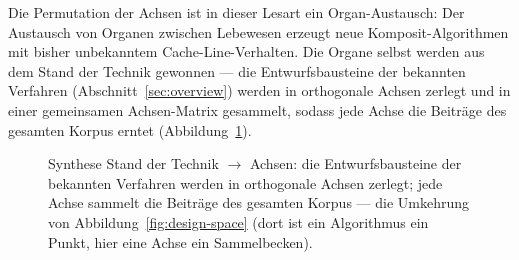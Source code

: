 \begin{nurlang}
Die Permutation der Achsen ist in dieser Lesart ein Organ-Austausch: Der Austausch von Organen zwischen
Lebewesen erzeugt neue Komposit-Algorithmen mit bisher unbekanntem Cache-Line-Verhalten. Die Organe selbst
werden aus dem Stand der Technik gewonnen --- die Entwurfsbausteine der bekannten Verfahren
(Abschnitt~\ref{sec:overview}) werden in orthogonale Achsen zerlegt und in einer gemeinsamen
Achsen-Matrix gesammelt, sodass jede Achse die Beiträge des gesamten Korpus erntet
(Abbildung~\ref{fig:synth}).
\begin{figure}[htbp]\centering
{}
\caption{Synthese Stand der Technik $\to$ Achsen: die Entwurfsbausteine der bekannten Verfahren werden in orthogonale Achsen zerlegt; jede Achse sammelt die Beiträge des gesamten Korpus --- die Umkehrung von Abbildung~\ref{fig:design-space} (dort ist ein Algorithmus ein Punkt, hier eine Achse ein Sammelbecken).}\label{fig:synth}
\end{figure}
\end{nurlang}

